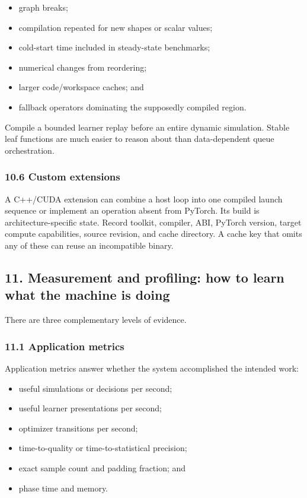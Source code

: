 \documentclass[
  10pt,
  letterpaper,
]{article}
\providecommand{\tightlist}{%
  \setlength{\itemsep}{0pt}\setlength{\parskip}{0pt}}
\begin{document}
\begin{itemize}
\tightlist
\item
  graph breaks;
\item
  compilation repeated for new shapes or scalar values;
\item
  cold-start time included in steady-state benchmarks;
\item
  numerical changes from reordering;
\item
  larger code/workspace caches; and
\item
  fallback operators dominating the supposedly compiled region.
\end{itemize}

Compile a bounded learner replay before an entire dynamic simulation.
Stable leaf functions are much easier to reason about than
data-dependent queue orchestration.

\subsubsection{10.6 Custom extensions}\label{106-custom-extensions}

A C++/CUDA extension can combine a host loop into one compiled launch
sequence or implement an operation absent from PyTorch. Its build is
architecture-specific state. Record toolkit, compiler, ABI, PyTorch
version, target compute capabilities, source revision, and cache
directory. A cache key that omits any of these can reuse an incompatible
binary.

\subsection{11. Measurement and profiling: how to learn what the machine
is
doing}\label{11-measurement-and-profiling-how-to-learn-what-the-machine-is-doing}

There are three complementary levels of evidence.

\subsubsection{11.1 Application metrics}\label{111-application-metrics}

Application metrics answer whether the system accomplished the intended
work:

\begin{itemize}
\tightlist
\item
  useful simulations or decisions per second;
\item
  useful learner presentations per second;
\item
  optimizer transitions per second;
\item
  time-to-quality or time-to-statistical precision;
\item
  exact sample count and padding fraction; and
\item
  phase time and memory.
\end{itemize}
\end{document}
